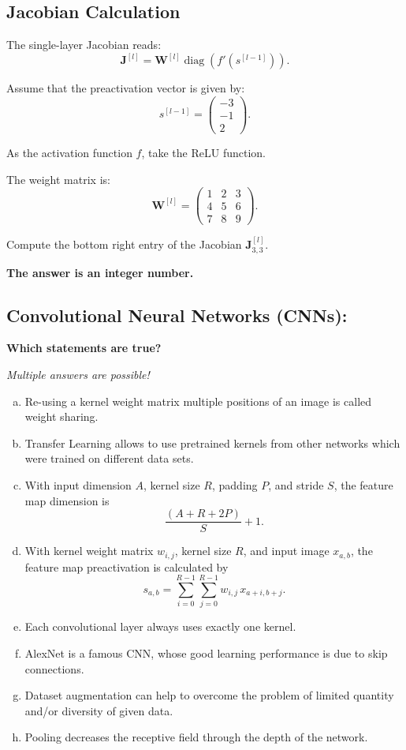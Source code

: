 \documentclass{article}
\begin{document}
\subsection*{Jacobian Calculation}

The single-layer Jacobian reads:
\[
\mathbf{J}^{[l]} = \mathbf{W}^{[l]} \operatorname{diag}\left(f'(s^{[l-1]})\right).
\]

Assume that the preactivation vector is given by:
\[
s^{[l-1]} = \begin{pmatrix} -3 \\ -1 \\ 2 \end{pmatrix}.
\]

As the activation function \(f\), take the ReLU function.

The weight matrix is:
\[
\mathbf{W}^{[l]} = \begin{pmatrix}
1 & 2 & 3 \\
4 & 5 & 6 \\
7 & 8 & 9
\end{pmatrix}.
\]

Compute the bottom right entry of the Jacobian \(\mathbf{J}^{[l]}_{3,3}\).

\textbf{The answer is an integer number.}

\subsection*{Convolutional Neural Networks (CNNs):}

\textbf{Which statements are true?}

\textit{Multiple answers are possible!}

\begin{enumerate}[(a)]
    \item Re-using a kernel weight matrix multiple positions of an image is called weight sharing.
    \item Transfer Learning allows to use pretrained kernels from other networks which were trained on different data sets.
    \item With input dimension \(A\), kernel size \(R\), padding \(P\), and stride \(S\), the feature map dimension is 
    \[
    \frac{(A + R + 2P)}{S} + 1.
    \]
    \item With kernel weight matrix \(w_{i,j}\), kernel size \(R\), and input image \(x_{a,b}\), the feature map preactivation is calculated by 
    \[
    s_{a,b} = \sum_{i=0}^{R-1} \sum_{j=0}^{R-1} w_{i,j} \, x_{a+i, b+j}.
    \]
    \item Each convolutional layer always uses exactly one kernel.
    \item AlexNet is a famous CNN, whose good learning performance is due to skip connections.
    \item Dataset augmentation can help to overcome the problem of limited quantity and/or diversity of given data.
    \item Pooling decreases the receptive field through the depth of the network.
\end{enumerate}
\end{document}
